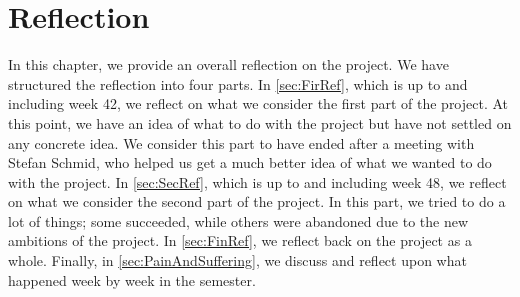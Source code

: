 \chapter{Reflection}\label{cha:weeklyProg}
In this chapter, we provide an overall reflection on the project. We have
structured the reflection into four parts. In \autoref{sec:FirRef}, which is up
to and including week 42, we reflect on what we consider the first part of the
project. At this point, we have an idea of what to do with the project but have
not settled on any concrete idea. We consider this part to have ended after a
meeting with Stefan Schmid, who helped us get a much better idea of what we
wanted to do with the project. In \autoref{sec:SecRef}, which is up to and
including week 48, we reflect on what we consider the second part of the
project. In this part, we tried to do a lot of things; some succeeded, while
others were abandoned due to the new ambitions of the project. In
\autoref{sec:FinRef}, we reflect back on the project as a whole. Finally, in
\autoref{sec:PainAndSuffering}, we discuss and reflect upon what happened week
by week in the semester.

\newpage
\newpage
\newpage


